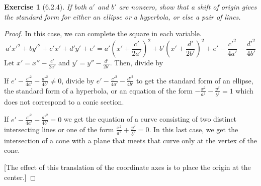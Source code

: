 \documentclass[12pt]{article}
\theoremstyle{plain}
\newtheorem{ex}{Exercise}
\begin{document}
\begin{ex} [6.2.4]
  If both $a'$ and $b'$ are nonzero, show that a shift of origin gives the standard form for either an ellipse or a hyperbola, or else a pair of lines.
\end{ex}

\begin{proof}
  In this case, we can complete the square in each variable.
  \[
    a'x'^2+by'^2+c'x'+d'y'+e'=a'\left(x'+\frac{c'}{2a'}\right)^2+b'\left(x'+\frac{d'}{2b'}\right)^2+e'-\frac{c'^2}{4a'}-\frac{d'^2}{4b'}
  \]
  Let $x'=x''-\frac{c'}{2a'}$ and $y'=y''-\frac{d'}{2b'}$. Then, divide by 

  If $e'-\frac{c'^2}{4a'}-\frac{d'^2}{4b'}\neq0$, divide by $e'-\frac{c'^2}{4a'}-\frac{d'^2}{4b'}$ to get the standard form of an ellipse, the standard form of a hyperbola, or an equation of the form $-\frac{x^2}{a^2}-\frac{y^2}{b^2}=1$ which does not correspond to a conic section.

  If $e'-\frac{c'^2}{4a'}-\frac{d'^2}{4b'}=0$ we get the equation of a curve consisting of two distinct intersecting lines or one of the form $\frac{x^2}{a^2}+\frac{y^2}{b^2}=0$. In this last case, we get the intersection of a cone with a plane that meets that curve only at the vertex of the cone.

  [The effect of this translation of the coordinate axes is to place the origin at the center.]
\end{proof}
\end{document}
